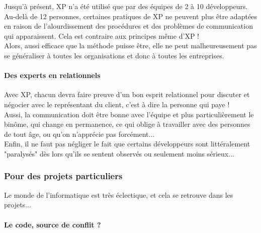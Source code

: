 \documentclass[]{article}
\let\oldparagraph\paragraph
\renewcommand{\paragraph}[1]{\oldparagraph{#1}\mbox{}}
\begin{document}
Jusqu'à présent, XP n'a été utilisé que par des équipes de 2 à 10
développeurs.\\
Au-delà de 12 personnes, certaines pratiques de XP ne peuvent plus être
adaptées en raison de l'alourdissement des procédures et des problèmes
de communication qui apparaissent. Cela est contraire aux principes même
d'XP !\\
Alors, aussi efficace que la méthode puisse être, elle ne peut
malheureusement pas se généraliser à toutes les organisations et donc à
toutes les entreprises.




\hypertarget{des-experts-en-relationnels}{%
\paragraph{Des experts en
relationnels}\label{des-experts-en-relationnels}}

Avec XP, chacun devra faire preuve d'un bon esprit relationnel pour
discuter et négocier avec le représentant du client, c'est à dire la
personne qui paye !~\\
Aussi, la communication doit être bonne avec l'équipe et plus
particulièrement le binôme, qui change en permanence, ce qui oblige à
travailler avec des personnes de tout âge, ou qu'on n'apprécie pas
forcément...\\
Enfin, il ne faut pas négliger le fait que certains développeurs sont
littéralement "paralysés" dès lors qu'ils se sentent observés ou
seulement moins sérieux...




\hypertarget{pour-des-projets-particuliers}{%
\subsubsection{Pour des projets
particuliers}\label{pour-des-projets-particuliers}}

Le monde de l'informatique est très éclectique, et cela se retrouve dans
les projets...




\hypertarget{le-code-source-de-conflit}{%
\paragraph{Le code, source de conflit
?}\label{le-code-source-de-conflit}}
\end{document}
